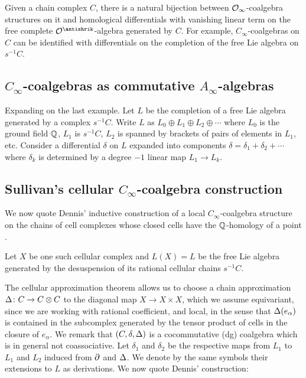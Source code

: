 Given a chain complex $C$, there is a natural bijection between $\mathcal{O}_\infty$-coalgebra structures on it and homological differentials with vanishing linear term on the free complete $\cO^\antishrik$-algebra generated by $C$.
For example, $C_\infty$-coalgebras on $C$ can be identified with differentials on the completion of the free Lie algebra on $s^{-1} C$.

\subsection{$C_\infty$-coalgebras as commutative $A_\infty$-algebras}

Expanding on the last example.
Let $L$ be the completion of a free Lie algebra generated by a complex $s^{-1}C$.
Write $L$ as $L_0 \oplus L_1 \oplus L_2 \oplus \dotsb $ where $L_0$ is the ground field $\mathbb{Q}$, $L_1$ is $s^{-1}C$, $L_2$ is spanned by brackets of pairs of elements in $L_1$, etc.
Consider a differential $\delta$ on $L$ expanded into components $\delta = \delta_1 + \delta_2 + \dotsb$ where $\delta_k$ is determined by a degree $-1$ linear map $L_1 \to L_k$.


\subsection{Sullivan's cellular $C_\infty$-coalgebra construction} \label{ss:dennis construction}

We now quote Dennis' inductive construction of a local $C_\infty$-coalgebra structure on the chains of cell complexes whose closed cells have the $\mathbb{Q}$-homology of a point \cite{sullivan2007appendix}.

Let $X$ be one such cellular complex and $L(X) = L$ be the free Lie algebra generated by the desuspension of its rational cellular chains $s^{-1}C$.

The cellular approximation theorem allows us to choose a chain approximation $\operatorname{\Delta} \colon C \to C \otimes C$ to the diagonal map $X \to X \times X$, which we assume equivariant, since we are working with rational coefficient, and local, in the sense that $\operatorname{\Delta}(e_\alpha)$ is contained in the subcomplex generated by the tensor product of cells in the closure of $e_\alpha$.
We remark that $(C, \delta, \operatorname{\Delta})$ is a cocommutative (dg) coalgebra which is in general not coassociative.
Let $\delta_1$ and $\delta_2$ be the respective maps from $L_1$ to $L_1$ and $L_2$ induced from $\partial$ and $\operatorname{\Delta}$.
We denote by the same symbols their extensions to $L$ as derivations.
We now quote Dennis' construction:

